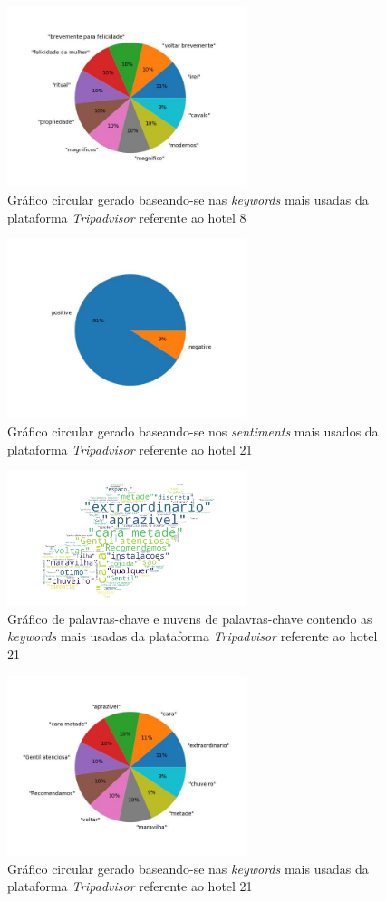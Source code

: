 \begin{figure}[!htb]
\centering
\includegraphics[width=7cm]{figuras/TripAdvisor/Hotels/hotel8_keywords.jpeg}
\caption{Gráfico circular gerado baseando-se nas \textit{keywords} mais usadas da plataforma \textit{Tripadvisor} referente ao hotel 8}
\label{fig:exemplofig}
\end{figure}

\begin{figure}[!htb]
\centering
\includegraphics[width=7cm]{figuras/TripAdvisor/Hotels/hotel21_sentiments.jpeg}
\caption{Gráfico circular gerado baseando-se nos \textit{sentiments} mais usados da plataforma \textit{Tripadvisor} referente ao hotel 21}
\label{fig:exemplofig}
\end{figure}

\begin{figure}[!htb]
\centering
\includegraphics[width=7cm]{figuras/TripAdvisor/Hotels/hotel21_keywordcloud.jpeg}
\caption{Gráfico de palavras-chave e nuvens de palavras-chave contendo as \textit{keywords} mais usadas da plataforma \textit{Tripadvisor} referente ao hotel 21}
\label{fig:exemplofig}
\end{figure}

\begin{figure}[!htb]
\centering
\includegraphics[width=7cm]{figuras/TripAdvisor/Hotels/hotel21_keywords.jpeg}
\caption{Gráfico circular gerado baseando-se nas \textit{keywords} mais usadas da plataforma \textit{Tripadvisor} referente ao hotel 21}
\label{fig:exemplofig}
\end{figure}

